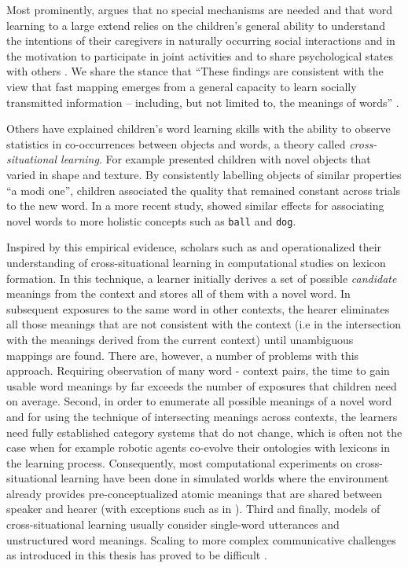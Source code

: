 Most prominently, \cite{tomasello03constructing,tomasello99cultural}
argues that no special mechanisms are needed and that word learning to
a large extend relies on the children's general ability to understand
the intentions of their caregivers in naturally occurring social
interactions \citep{tomasello01perceiving} and in the motivation to
participate in joint activities and to share psychological states with
others \citep*{tomasello05understanding}. We share the stance that
``These findings are consistent with the view that fast mapping
emerges from a general capacity to learn socially transmitted
information -- including, but not limited to, the meanings of words''
\citep[p. 34ff]{bloom00how-children}.


Others have explained children's word learning skills with the ability
to observe statistics in co-occurrences between objects and words, a
theory called \emph{cross-situational learning}. For example
\cite{akhtar99early} presented children with novel objects that varied
in shape and texture. By consistently labelling objects of similar
properties ``a modi one'', children associated the quality that
remained constant across trials to the new word. In a more recent
study, \citep{smith07infants} showed similar effects for associating
novel words to more holistic concepts such as \texttt{ball} and
\texttt{dog}.


Inspired by this empirical evidence, scholars such as
\cite{siskind96cross-situational} and \cite*{smith06cross-situational}
operationalized their understanding of cross-situational learning in
computational studies on lexicon formation. In this technique, a
learner initially derives a set of possible \emph{candidate} meanings
from the context and stores all of them with a novel word. In
subsequent exposures to the same word in other contexts, the hearer
eliminates all those meanings that are not consistent with the context
(i.e in the intersection with the meanings derived from the current
context) until unambiguous mappings are found. There are, however, a
number of problems with this approach. Requiring observation of many
word - context pairs, the time to gain usable word meanings by far
exceeds the number of exposures that children need on average. Second,
in order to enumerate all possible meanings of a novel word and for
using the technique of intersecting meanings across contexts, the
learners need fully established category systems that do not change,
which is often not the case when for example robotic agents co-evolve
their ontologies with lexicons in the learning process. Consequently,
most computational experiments on cross-situational learning have been
done in simulated worlds where the environment already provides
pre-conceptualized atomic meanings that are shared between speaker and
hearer (with exceptions such as in
\citealp*{debeule06cross-situational}). Third and finally, models of
cross-situational learning usually consider single-word utterances and
unstructured word meanings. Scaling to more complex communicative
challenges as introduced in this thesis has proved to be difficult
\citep{vogt03investigating}.\\

